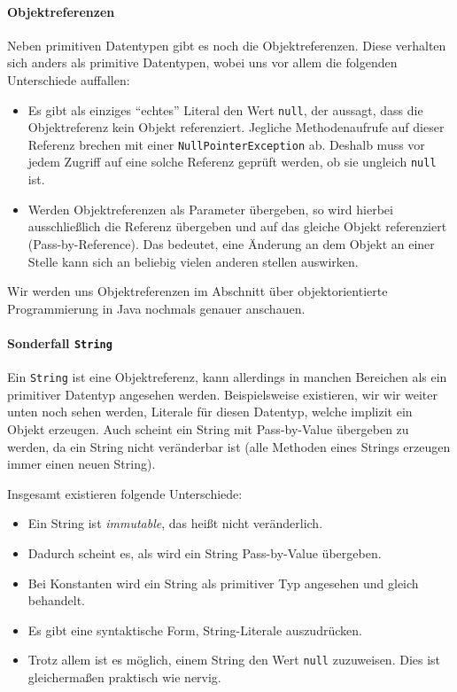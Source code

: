 	\paragraph{Objektreferenzen}
		Neben primitiven Datentypen gibt es noch die Objektreferenzen. Diese verhalten sich anders als primitive Datentypen, wobei uns vor allem die folgenden Unterschiede auffallen:
		\begin{itemize}
			\item Es gibt als einziges \enquote{echtes} Literal den Wert \lstinline|null|, der aussagt, dass die Objektreferenz kein Objekt referenziert. Jegliche Methodenaufrufe auf dieser Referenz brechen mit einer \lstinline|NullPointerException| ab. Deshalb muss vor jedem Zugriff auf eine solche Referenz geprüft werden, ob sie ungleich \lstinline|null| ist.
			\item Werden Objektreferenzen als Parameter übergeben, so wird hierbei ausschließlich die Referenz übergeben und auf das gleiche Objekt referenziert (Pass-by-Reference). Das bedeutet, eine Änderung an dem Objekt an einer Stelle kann sich an beliebig vielen anderen stellen auswirken.
		\end{itemize}
		Wir werden uns Objektreferenzen im Abschnitt  über objektorientierte Programmierung in Java nochmals genauer anschauen.
	
	\paragraph{Sonderfall \lstinline|String|}
		Ein \lstinline|String| ist eine Objektreferenz, kann allerdings in manchen Bereichen als ein primitiver Datentyp angesehen werden. Beispielsweise existieren, wir wir weiter unten noch sehen werden, Literale für diesen Datentyp, welche implizit ein Objekt erzeugen. Auch scheint ein String mit Pass-by-Value übergeben zu werden, da ein String nicht veränderbar ist (alle Methoden eines Strings erzeugen immer einen neuen String).
		
		Insgesamt existieren folgende Unterschiede:
		\begin{itemize}
			\item Ein String ist \textit{immutable}, das heißt nicht veränderlich.
			\item Dadurch scheint es, als wird ein String Pass-by-Value übergeben.
			\item Bei Konstanten wird ein String als primitiver Typ angesehen und gleich behandelt.
			\item Es gibt eine syntaktische Form, String-Literale auszudrücken.
			\item Trotz allem ist es möglich, einem String den Wert \lstinline|null| zuzuweisen. Dies ist gleichermaßen praktisch wie nervig.
		\end{itemize}

